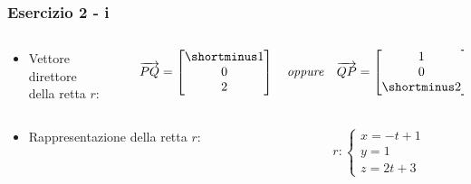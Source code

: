 \documentclass{beamer}
\begin{document}
\begin{frame}
\frametitle{Esercizio 2 - i}
\begin{columns}
\begin{column}{0.48\textwidth}
\begin{itemize}
\item Vettore direttore \\ della retta $r$:
\end{itemize}
\end{column}
\begin{column}{0.58\textwidth}
\begin{displaymath}
\overrightarrow{PQ} =\begin{bmatrix}\shortminus 1 \\ 0 \\ 2 \end{bmatrix}
    \quad
    \mathit{oppure}
    \quad
\overrightarrow{QP} =\begin{bmatrix}1 \\0 \\ \shortminus 2 \end{bmatrix}
\end{displaymath}
\end{column}
\end{columns}
\begin{columns}
\begin{column}{0.58\textwidth}
\begin{itemize}
\item Rappresentazione della retta $r$:
\end{itemize}
\end{column}
\begin{column}{0.48\textwidth}
\begin{displaymath}
r :\begin{cases} x = -t +1\\ y = 1 \\z = 2t+3 \end{cases}
\end{displaymath}
\end{column}
\end{columns}

\end{frame}
\end{document}

